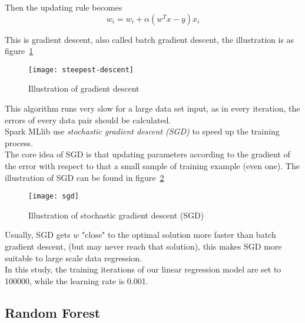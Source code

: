 Then the updating rule becomes
\begin{equation}
w_i = w_i + \alpha (w^Tx-y)x_i
\end{equation}

This is gradient descent, also called batch gradient descent, the illustration is as figure~\ref{fg:gradient_descent}
\begin{figure}[h]
	\centering
	\texttt{[image: steepest-descent]}
	\caption{Illustration of gradient descent}
	\label{fg:gradient_descent}
\end{figure}

\clearpage
This algorithm runs very slow for a large data set input, as in every iteration, the errors of every data pair should be calculated.\\


Spark MLlib use \emph{stochastic gradient descent (SGD)} to speed up the training process\cite{7_mllib_linear_methods}.\\


The core idea of SGD is that updating parameters according to the gradient of the error with respect to that a small sample of training example (even one). The illustration of SGD can be found in figure~\ref{fg:SGD}
\begin{figure}[h]
	\centering
	\texttt{[image: sgd]}
	\caption{Illustration of stochastic gradient descent (SGD)}
	\label{fg:SGD}
\end{figure}
Usually, SGD gets $ w $ "close" to the optimal solution more faster than batch gradient descent\cite{bottou2010large}, (but may never reach that solution), this makes SGD more suitable to large scale data regression.\\


In this study, the training iterations of our linear regression model are set to 100000, while the learning rate is 0.001.

\subsection{Random Forest}
